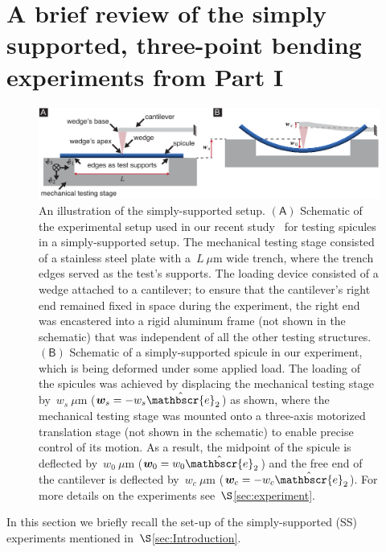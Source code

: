 \documentclass[preprint,10pt,times]{elsarticle}
\numberwithin{equation}{section}
\newcommand{\physe}{\hat{\mathbscr{e}}} %
\newcommand{\physwc}{\bm{w}_c}
\newcommand{\physws}{\bm{w}_s}
\newcommand{\physwo}{\bm{w}_0}
\newcommand{\pr}[1]{\left( #1 \right)}
\newcommand{\subf}[1]{\pr{\textsf{#1}}}
\begin{document}
\section{A brief review of the simply supported, three-point bending experiments
from Part I\label{sec:experiment}}

\begin{figure}
\centering{}
\includegraphics[width=1\textwidth]{../Figures_Submit/SSsetup_V4.pdf}\caption{\label{fig:SSsetup}
An illustration of the simply-supported setup. %
$\subf{A}$
Schematic of the experimental setup used in our recent study~\cite{Sayaka2021Sawtooth} for testing spicules in a simply-supported setup. %
The mechanical testing stage consisted of a stainless steel plate with a~$L~\mu$m wide trench, where the trench edges served as the test's supports. %
The loading device consisted of a wedge attached to a cantilever; to ensure that the
cantilever's right end remained fixed in space during the experiment,
the right end was encastered into a rigid aluminum frame (not shown
in the schematic) that was independent of all the other testing structures. %
$\subf{B}$ Schematic of a simply-supported spicule in our experiment, which is
being deformed under some applied load. %
The loading of the spicules was achieved by displacing the mechanical testing stage by~$w_s~\mu$m
($\physws=-w_s\physe_2$) as shown, where the mechanical testing stage
was mounted onto a three-axis motorized translation stage (not shown
in the schematic) to enable precise control of its motion. %
As a result, the midpoint of the spicule is deflected by~$w_0~\mu$m ($\physwo=w_0\physe_2$)
and the free end of the cantilever is deflected by~$w_c~\mu$m ($\physwc=-w_c\physe_2$). %
For more details on the experiments
see~$\S$\ref{sec:experiment}. %
}
\end{figure}

In this section we briefly recall the set-up of the simply-supported
(SS) experiments mentioned in~$\S$\ref{sec:Introduction}.
\end{document}
